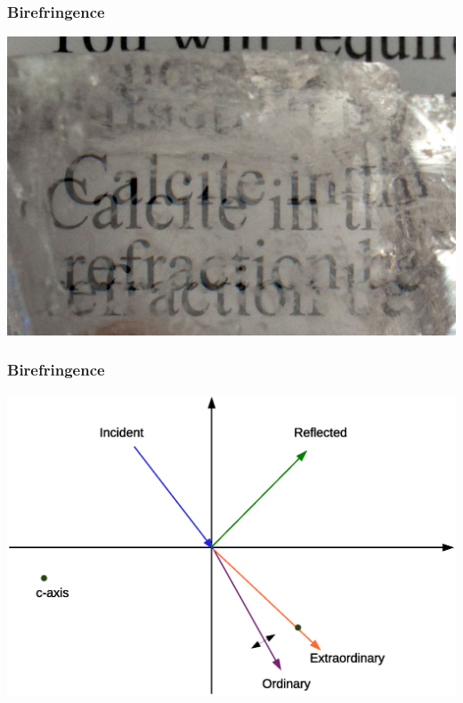 \documentclass{beamer}
\begin{document}
\begin{frame}
\frametitle{Birefringence}
\begin{center}
\includegraphics[scale=0.6]{calcite_birefringence.jpg}
\end{center}
\end{frame}
\begin{frame}
\frametitle{Birefringence}
\begin{center}
\includegraphics[scale=0.4]{incident_birefreingence.eps}
\end{center}
\end{frame}
\end{document}
